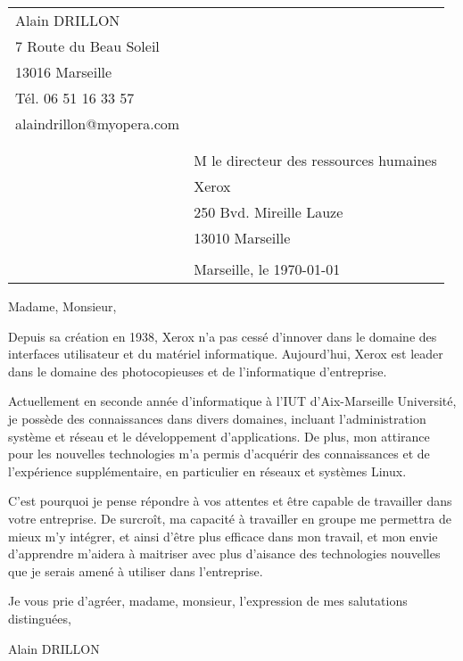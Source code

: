 \documentclass[11pt]{article}
\begin{document}
    \thispagestyle{empty}
    \begin{tabular}{p{10cm}p{10cm}}
        Alain DRILLON \\ 
        7 Route du Beau Soleil \\
        13016 Marseille \\
        Tél. 06 51 16 33 57\\
        alaindrillon@myopera.com\\
        & \\ &\\
        & M le directeur des ressources humaines\\
        & Xerox\\
        & 250 Bvd. Mireille Lauze\\
        & 13010 Marseille \\
        & \\
        & Marseille, le \today
    \end{tabular}

    \vspace{2cm}

    Madame, Monsieur,
    \vspace{0.75cm}

    Depuis sa création en 1938, Xerox n'a pas cessé d'innover dans le domaine des interfaces utilisateur et du matériel informatique. Aujourd'hui, Xerox est leader dans le domaine des photocopieuses et de l'informatique d'entreprise.

    \vspace{0.75cm}
    Actuellement en seconde année d'informatique à l'IUT d'Aix-Marseille Université, je possède des connaissances dans divers domaines, incluant l'administration système et réseau et le développement d'applications.
    De plus, mon attirance pour les nouvelles technologies m'a permis d’acquérir des connaissances et de l'expérience supplémentaire, en particulier en réseaux et systèmes Linux.
   
   C'est pourquoi je pense répondre à vos attentes et être capable de travailler dans votre entreprise. De surcroît, ma capacité à travailler en groupe me permettra de mieux m'y intégrer, et ainsi d'être plus efficace dans mon travail, et mon envie d'apprendre m'aidera à maitriser avec plus d'aisance des technologies nouvelles que je serais amené à utiliser dans l'entreprise.

   \vspace{0.50cm}
   Je vous prie d'agréer, madame, monsieur, l'expression de mes salutations distinguées,

   \vspace{0.50cm}
   Alain DRILLON
\end{document}
